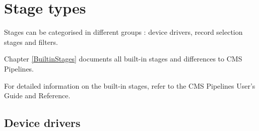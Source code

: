 








\chapter{Stage types}
Stages can be categorised in different groups : device drivers, record selection stages and filters.

Chapter \ref{BuiltinStages} documents all built-in stages and differences to CMS Pipelines.

For detailed information on the built-in stages, refer to the CMS Pipelines User's Guide and Reference.

\section{Device drivers}\label{ch:devicedrivers}


